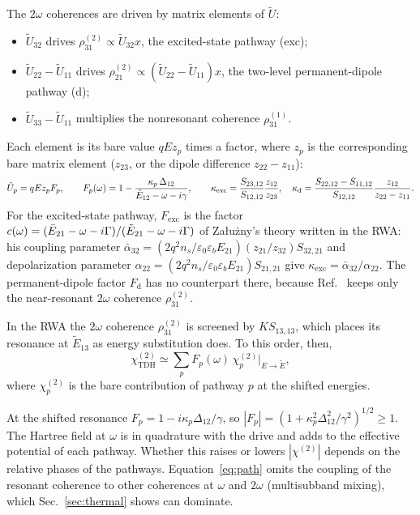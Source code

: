 \documentclass[11pt]{article}
\newcommand{\chitwo}{\chi^{(2)}}
\newcommand{\Et}{\tilde E}
\let\hbar\relax\DeclareRobustCommand{\hbar}{{\mathchar'26\mkern-9mu h}}
\begin{document}
The $2\omega$ coherences are driven by matrix elements of $\tilde U$:
\begin{itemize}
\item $\tilde U_{32}$ drives $\rho^{(2)}_{31}\propto\tilde U_{32}x$, the excited-state pathway (exc);
\item $\tilde U_{22}-\tilde U_{11}$ drives $\rho^{(2)}_{21}\propto(\tilde U_{22}-\tilde U_{11})x$, the two-level permanent-dipole pathway (d);
\item $\tilde U_{33}-\tilde U_{11}$ multiplies the nonresonant coherence $\rho^{(1)}_{31}$.
\end{itemize}
Each element is its bare value $qEz_p$ times a factor, where $z_p$ is the corresponding bare matrix element ($z_{23}$, or the dipole difference $z_{22}-z_{11}$):
\begin{equation}
\tilde U_p=qEz_pF_p,\qquad F_p(\omega)=1-\frac{\kappa_p\,\Delta_{12}}{\Et_{12}-\hbar\omega-i\gamma},\qquad
\kappa_\mathrm{exc}=\frac{S_{23,12}}{S_{12,12}}\frac{z_{12}}{z_{23}},\quad
\kappa_\mathrm{d}=\frac{S_{22,12}-S_{11,12}}{S_{12,12}}\frac{z_{12}}{z_{22}-z_{11}}.\label{eq:F}
\end{equation}
For the excited-state pathway, $F_\mathrm{exc}$ is the factor $c(\omega)=(\bar E_{21}-\hbar\omega-i\Gamma)/(\Et_{21}-\hbar\omega-i\Gamma)$ of Załużny's theory \cite{Zaluzny1995} written in the RWA: his coupling parameter $\bar\alpha_{32}=(2q^2n_s/\varepsilon_0\varepsilon_bE_{21})(z_{21}/z_{32})S_{32,21}$ and depolarization parameter $\alpha_{22}=(2q^2n_s/\varepsilon_0\varepsilon_bE_{21})S_{21,21}$ give $\kappa_\mathrm{exc}=\bar\alpha_{32}/\alpha_{22}$. The permanent-dipole factor $F_\mathrm{d}$ has no counterpart there, because Ref.~\cite{Zaluzny1995} keeps only the near-resonant $2\omega$ coherence $\rho^{(2)}_{31}$.

In the RWA the $2\omega$ coherence $\rho^{(2)}_{31}$ is screened by $KS_{13,13}$, which places its resonance at $\Et_{13}$ as energy substitution does. To this order, then,
\begin{equation}
\chitwo_\mathrm{TDH}\simeq\sum_pF_p(\omega)\,\chitwo_p\big|_{E\to\Et},\label{eq:path}
\end{equation}
where $\chitwo_p$ is the bare contribution of pathway $p$ at the shifted energies.

At the shifted resonance $F_p=1-i\kappa_p\Delta_{12}/\gamma$, so $|F_p|=(1+\kappa_p^2\Delta_{12}^2/\gamma^2)^{1/2}\ge1$. The Hartree field at $\omega$ is in quadrature with the drive and adds to the effective potential of each pathway. Whether this raises or lowers $|\chitwo|$ depends on the relative phases of the pathways. Equation~\eqref{eq:path} omits the coupling of the resonant coherence to other coherences at $\omega$ and $2\omega$ (multisubband mixing), which Sec.~\ref{sec:thermal} shows can dominate.
\end{document}
